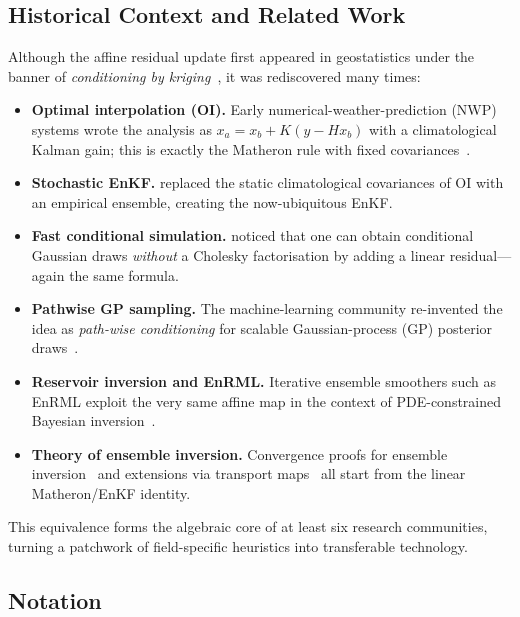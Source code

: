 \documentclass[wcp]{jmlr} %
\begin{document}
\subsection{Historical Context and Related Work}\label{sec:history}

Although the affine residual update first appeared in geostatistics under the banner of \emph{conditioning by kriging}~\citep{Chiles2018Kriging}, it was rediscovered many times:
\begin{itemize}
    \item \textbf{Optimal interpolation (OI).}  Early numerical-weather-prediction (NWP) systems wrote the analysis as
    $x_a = x_b + K(y - Hx_b)$ with a climatological Kalman gain; this is exactly the Matheron rule with fixed covariances~\citep{Hunt2007LETKF}.
    \item \textbf{Stochastic EnKF.}  \citet{Evensen2003EnKF} replaced the static climatological covariances of OI with an empirical ensemble, creating the now-ubiquitous EnKF.
    \item \textbf{Fast conditional simulation.}  \citet{Doucet2010Note} noticed that one can obtain conditional Gaussian draws \emph{without} a Cholesky factorisation by adding a linear residual—again the same formula.
    \item \textbf{Pathwise GP sampling.}  The machine-learning community re-invented the idea as \emph{path-wise conditioning} for scalable Gaussian-process (GP) posterior draws~\citep{Wilson2020Efficiently,Wilson2021Pathwise,Borovitskiy2020Matern}.
    \item \textbf{Reservoir inversion and EnRML.}  Iterative ensemble smoothers such as EnRML exploit the very same affine map in the context of PDE-constrained Bayesian inversion~\citep{Chen2012EnRML}.
    \item \textbf{Theory of ensemble inversion.}  Convergence proofs for ensemble inversion~\citep{Schillings2016EnKFInverse} and extensions via transport maps~\citep{Spantini2022Coupling} all start from the linear Matheron/EnKF identity.
\end{itemize}

This equivalence forms the algebraic core of at least six research communities, turning a patchwork of field-specific heuristics into transferable technology.

\subsection{Notation}
\end{document}
